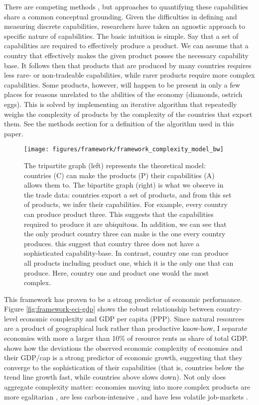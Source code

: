 \documentclass[11pt]{article}
\begin{document}
There are competing methods \citep{tacchella_new_2012,hidalgo_building_2009,inoua_simple_2016}, but approaches to quantifying these capabilities share a common conceptual grounding. Given the difficulties in defining and measuring discrete capabilities, researchers have taken an agnostic approach to specific nature of capabilities. The basic intuition is simple. Say that a set of capabilities are required to effectively produce a product. We can assume that a country that effectively makes the given product posses the necessary capability base. It follows then that products that are produced by many countries requires less rare- or non-tradeable capabilities, while rarer products require more complex capabilities. Some products, however, will happen to be present in only a few places for reasons unrelated to the abilities of the economy (diamonds, ostrich eggs). This is solved by implementing an iterative algorithm that repeatedly weighs the complexity of products by the complexity of the countries that export them. See the methods section for a definition of the algorithm used in this paper.


\begin{figure}[htpb]
  \centering
  \texttt{[image: figures/framework/framework\_complexity\_model\_bw]}
	\caption{The tripartite graph (left) represents the theoretical model: countries (C) can make the products (P) their capabilities (A) allows them to. The bipartite graph (right) is what we observe in the trade data: countries export a set of products, and from this set of products, we infer their capabilities. For example, every country can produce product three. This suggests that the capabilities required to produce it are ubiquitous. In addition, we can see that the only product country three can make is the one every country produces. this suggest that country three does not have a sophisticated capability-base. In contrast, country one can produce all products including product one, which it is the only one that can produce. Here, country one and product one would the most complex.}
	\label{fig:complexity-model}
\end{figure}

This framework has proven to be a strong predictor of economic performance. Figure \ref{fig:framework-eci-gdp} shows the robust relationship between country-level economic complexity and GDP per capita (PPP). Since natural resources are a product of geographical luck rather than productive know-how, I separate economies with more a larger than 10\% of resource rents as share of total GDP. \cite{hausmann_atlas_2013} shows how the deviations the observed economic complexity of economies and their GDP/cap is a strong predictor of economic growth, suggesting that they converge to the sophistication of their capabilities (that is, countries below the trend line growth fast, while countries above slows down). Not only does aggregate complexity matter: economies moving into more complex products are more egalitarian \citep{hartmann_linking_2017-1}, are less carbon-intensive \citep{can_impact_2017}, and have less volatile job-markets \citep{adam_economic_2019}.
\end{document}
